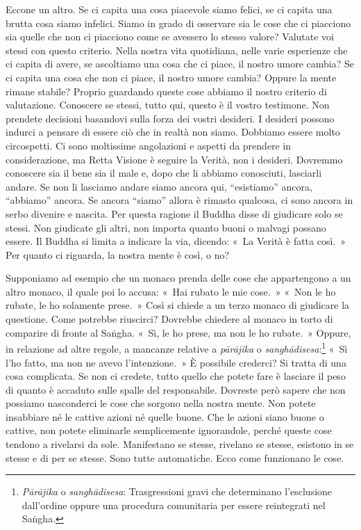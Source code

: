 Eccone un altro. Se ci capita una cosa piacevole siamo felici, se ci
capita una brutta cosa siamo infelici. Siamo in grado di osservare sia
le cose che ci piacciono sia quelle che non ci piacciono come se
avessero lo stesso valore? Valutate voi stessi con questo criterio.
Nella nostra vita quotidiana, nelle varie esperienze che ci capita di
avere, se ascoltiamo una cosa che ci piace, il nostro umore cambia? Se
ci capita una cosa che non ci piace, il nostro umore cambia? Oppure la
mente rimane stabile? Proprio guardando queste cose abbiamo il nostro
criterio di valutazione. Conoscere se stessi, tutto qui, questo è il
vostro testimone. Non prendete decisioni basandovi sulla forza dei
vostri desideri. I desideri possono indurci a pensare di essere ciò che
in realtà non siamo. Dobbiamo essere molto circospetti. Ci sono
moltissime angolazioni e aspetti da prendere in considerazione, ma Retta
Visione è seguire la Verità, non i desideri. Dovremmo conoscere sia il
bene sia il male e, dopo che li abbiamo conosciuti, lasciarli andare. Se
non li lasciamo andare siamo ancora qui, ``esistiamo'' ancora,
``abbiamo'' ancora. Se ancora ``siamo'' allora è rimasto qualcosa, ci
sono ancora in serbo divenire e nascita. Per questa ragione il Buddha
disse di giudicare solo se stessi. Non giudicate gli altri, non importa
quanto buoni o malvagi possano essere. Il Buddha si limita a indicare la
via, dicendo: «~La Verità è fatta così.~» Per quanto ci riguarda, la
nostra mente è così, o no?

Supponiamo ad esempio che un monaco prenda delle cose che appartengono a
un altro monaco, il quale poi lo accusa: «~Hai rubato le mie cose.~»
«~Non le ho rubate, le ho solamente prese.~» Così si chiede a un terzo
monaco di giudicare la questione. Come potrebbe riuscirci? Dovrebbe
chiedere al monaco in torto di comparire di fronte al Saṅgha. «~Sì, le
ho prese, ma non le ho rubate.~» Oppure, in relazione ad altre regole, a
mancanze relative a \emph{pārājika} o \emph{sanghādisesa}:\footnote{\emph{Pārājika}
  o \emph{sanghādisesa}: Trasgressioni gravi che determinano
  l'esclusione dall'ordine oppure una procedura comunitaria per essere
  reintegrati nel Saṅgha.} «~Sì l'ho fatto, ma non ne avevo
l'intenzione.~» È possibile crederci? Si tratta di una cosa complicata.
Se non ci credete, tutto quello che potete fare è lasciare il peso di
quanto è accaduto sulle spalle del responsabile. Dovreste però sapere
che non possiamo nasconderci le cose che sorgono nella nostra mente. Non
potete insabbiare né le cattive azioni né quelle buone. Che le azioni
siano buone o cattive, non potete eliminarle semplicemente ignorandole,
perché queste cose tendono a rivelarsi da sole. Manifestano se stesse,
rivelano se stesse, esistono in se stesse e di per se stesse. Sono tutte
automatiche. Ecco come funzionano le cose.

